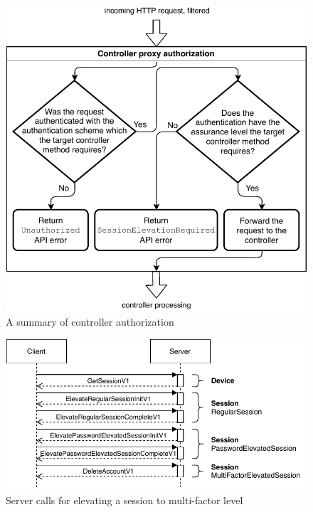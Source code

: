 \begin{figure}[!htb]
    \includegraphics[width=\textwidth]{figures/controller-authorization.pdf}
    \caption{A summary of controller authorization}
    \label{fig:controller-authorization}
\end{figure}

\begin{figure}[!htb]
    \includegraphics[width=\textwidth]{figures/elevate-to-mfa-session.pdf}
    \caption{Server calls for elevating a session to multi-factor level}
    \label{fig:elevate-to-mfa-session}
\end{figure}

